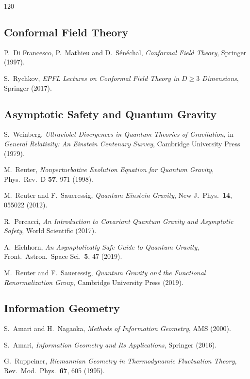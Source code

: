 \documentclass[11pt, twoside, openright]{book}
\theoremstyle{dotted}
\theoremstyle{definition}
\begin{document}
\begin{thebibliography}{120}
\subsection*{Conformal Field Theory}

P.~Di Francesco, P.~Mathieu and D.~S\'en\'echal,
\textit{Conformal Field Theory},
Springer (1997).

S.~Rychkov,
\textit{EPFL Lectures on Conformal Field Theory in $D \geq 3$ Dimensions},
Springer (2017).

\subsection*{Asymptotic Safety and Quantum Gravity}

S.~Weinberg,
\textit{Ultraviolet Divergences in Quantum Theories of Gravitation},
in \textit{General Relativity: An Einstein Centenary Survey},
Cambridge University Press (1979).

M.~Reuter,
\textit{Nonperturbative Evolution Equation for Quantum Gravity},
Phys.\ Rev.\ D \textbf{57}, 971 (1998).

M.~Reuter and F.~Saueressig,
\textit{Quantum Einstein Gravity},
New J.\ Phys.\ \textbf{14}, 055022 (2012).

R.~Percacci,
\textit{An Introduction to Covariant Quantum Gravity and Asymptotic Safety},
World Scientific (2017).

A.~Eichhorn,
\textit{An Asymptotically Safe Guide to Quantum Gravity},
Front.\ Astron.\ Space Sci.\ \textbf{5}, 47 (2019).

M.~Reuter and F.~Saueressig,
\textit{Quantum Gravity and the Functional Renormalization Group},
Cambridge University Press (2019).

\subsection*{Information Geometry}

S.~Amari and H.~Nagaoka,
\textit{Methods of Information Geometry},
AMS (2000).

S.~Amari,
\textit{Information Geometry and Its Applications},
Springer (2016).

G.~Ruppeiner,
\textit{Riemannian Geometry in Thermodynamic Fluctuation Theory},
Rev.\ Mod.\ Phys.\ \textbf{67}, 605 (1995).


\end{thebibliography}
\end{document}
